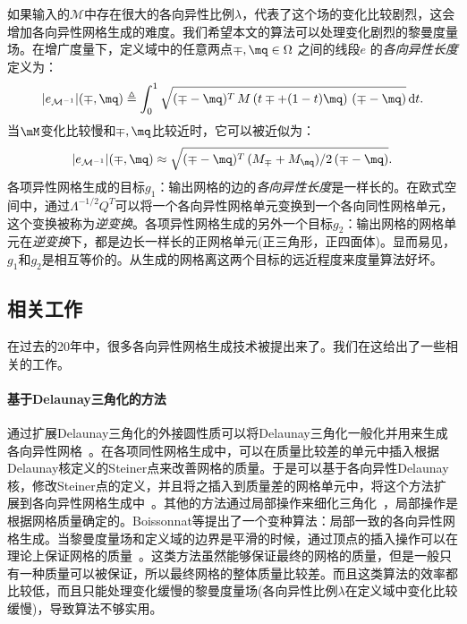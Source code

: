 如果输入的$\mathcal{M}$中存在很大的各向异性比例$\lambda$，代表了这个场的变化比较剧烈，这会增加各向异性网格生成的难度。我们希望本文的算法可以处理变化剧烈的黎曼度量场。在增广度量下，定义域中的任意两点$\mp, \mq \in \Omega$ 之间的线段$e$ 的\emph{各向异性长度}定义为：
\begin{equation}\label{equ:aniso_distance}
|e_{\mathcal{M}^{-1}}|(\mp, \mq) \triangleq \int_{0}^1 \sqrt{(\mp-\mq)^T \, M\left(t\mp+(1-t)\mq\right)\, (\mp-\mq)} \,\mathrm{d}t.
\end{equation}
当$\mM$变化比较慢和$\mp, \mq$比较近时，它可以被近似为：
\begin{equation} \label{equ:app_aniso_distance}
|e_{\mathcal{M}^{-1}}|(\mp, \mq) \approx \sqrt{(\mp-\mq)^T \, (M_\mp+M_\mq)/2 \, (\mp-\mq)}.
\end{equation}
各项异性网格生成的目标$g_1$：输出网格的边的\emph{各向异性长度}是一样长的。在欧式空间中，通过$\Lambda^{-1/2} Q^T$可以将一个各向异性网格单元变换到一个各向同性网格单元，这个变换被称为\emph{逆变换}。各项异性网格生成的另外一个目标$g_2$：输出网格的网格单元在\emph{逆变换}下，都是边长一样长的正网格单元(正三角形，正四面体)。显而易见，$g_1$和$g_2$是相互等价的。从生成的网格离这两个目标的远近程度来度量算法好坏。

\subsection{相关工作}
在过去的20年中，很多各向异性网格生成技术被提出来了。我们在这给出了一些相关的工作。

\paragraph{基于Delaunay三角化的方法}
通过扩展Delaunay三角化的外接圆性质可以将Delaunay三角化一般化并用来生成各向异性网格~\cite{Thompson1998,Frey2008}。在各项同性网格生成中，可以在质量比较差的单元中插入根据Delaunay核定义的Steiner点来改善网格的质量。于是可以基于各向异性Delaunay核，修改Steiner点的定义，并且将之插入到质量差的网格单元中，将这个方法扩展到各向异性网格生成中~\cite{Frey2008,Dobrzynski2008}。其他的方法通过局部操作来细化三角化~\cite{Hecht1998,Jiao2010}，局部操作是根据网格质量确定的。Boissonnat等提出了一个变种算法：局部一致的各向异性网格生成。当黎曼度量场和定义域的边界是平滑的时候，通过顶点的插入操作可以在理论上保证网格的质量~\cite{Boissonnat2008,Boissonnat2011,Boissonnat2013}。这类方法虽然能够保证最终的网格的质量，但是一般只有一种质量可以被保证，所以最终网格的整体质量比较差。而且这类算法的效率都比较低，而且只能处理变化缓慢的黎曼度量场(各向异性比例$\lambda$在定义域中变化比较缓慢)，导致算法不够实用。

